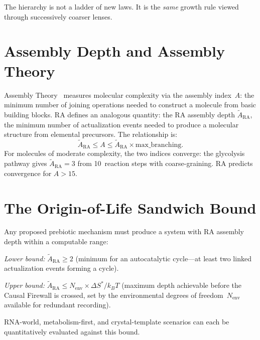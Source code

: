 \documentclass[11pt,a4paper]{article}
\theoremstyle{plain}
\theoremstyle{definition}
\theoremstyle{remark}
\begin{document}
The hierarchy is not a ladder of new laws.  It is the \emph{same} growth rule viewed
through successively coarser lenses.

\section{Assembly Depth and Assembly Theory}\label{sec:assembly}

Assembly Theory~\cite{Sharma2023} measures molecular complexity via the assembly
index~$A$: the minimum number of joining operations needed to construct a molecule
from basic building blocks.  RA defines an analogous quantity: the RA assembly depth
$\tilde{A}_{\mathrm{RA}}$, the minimum number of actualization events needed to
produce a molecular structure from elemental precursors.  The relationship is:
\begin{equation}
\tilde{A}_{\mathrm{RA}} \leq A \leq \tilde{A}_{\mathrm{RA}} \times
\text{max\_branching}.
\label{eq:assembly}
\end{equation}
For molecules of moderate complexity, the two indices converge: the glycolysis
pathway gives $\tilde{A}_{\mathrm{RA}} = 3$ from 10~reaction steps with
coarse-graining.  RA predicts convergence for $A > 15$.

\section{The Origin-of-Life Sandwich Bound}\label{sec:sandwich}

Any proposed prebiotic mechanism must produce a system with RA assembly depth within
a computable range:

\emph{Lower bound:} $\tilde{A}_{\mathrm{RA}} \geq 2$ (minimum for an autocatalytic
cycle---at least two linked actualization events forming a cycle).

\emph{Upper bound:}
$\tilde{A}_{\mathrm{RA}} \leq N_{\mathrm{env}} \times \Delta S^* / k_B T$
(maximum depth achievable before the Causal Firewall is crossed, set by the
environmental degrees of freedom~$N_{\mathrm{env}}$ available for redundant
recording).

RNA-world, metabolism-first, and crystal-template scenarios can each be
quantitatively evaluated against this bound.
\end{document}
